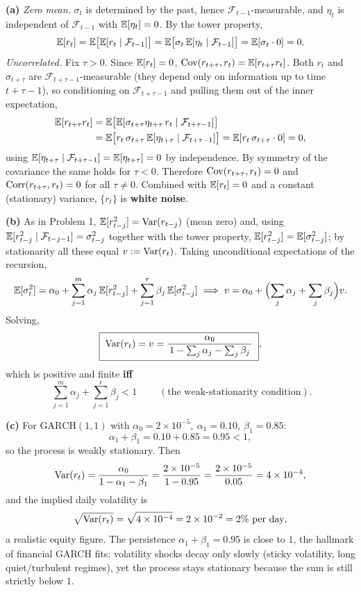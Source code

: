 \documentclass[11pt]{article}
\newcommand{\F}{\mathcal{F}}
\begin{document}
\textbf{(a)} \emph{Zero mean.} $\sigma_t$ is determined by the past, hence $\F_{t-1}$-measurable, and $\eta_t$ is independent of $\F_{t-1}$ with $\mathbb{E}[\eta_t]=0$. By the tower property,
\[
\E[r_t]=\E\bigl[\E[r_t\mid\F_{t-1}]\bigr]
=\E\bigl[\sigma_t\,\E[\eta_t\mid\F_{t-1}]\bigr]
=\E[\sigma_t\cdot0]=0 .
\]
\emph{Uncorrelated.} Fix $\tau>0$. Since $\mathbb{E}[r_t]=0$, $\operatorname{Cov}(r_{t+\tau},r_t)=\mathbb{E}[r_{t+\tau}r_t]$. Both $r_t$ and $\sigma_{t+\tau}$ are $\F_{t+\tau-1}$-measurable (they depend only on information up to time $t+\tau-1$), so conditioning on $\F_{t+\tau-1}$ and pulling them out of the inner expectation,
\[
\begin{aligned}
\E[r_{t+\tau}r_t]
&=\E\bigl[\E[\sigma_{t+\tau}\eta_{t+\tau}\,r_t\mid\F_{t+\tau-1}]\bigr]\\
&=\E\bigl[r_t\,\sigma_{t+\tau}\,\E[\eta_{t+\tau}\mid\F_{t+\tau-1}]\bigr]
=\E[r_t\,\sigma_{t+\tau}\cdot0]=0 ,
\end{aligned}
\]
using $\E[\eta_{t+\tau}\mid\F_{t+\tau-1}]=\E[\eta_{t+\tau}]=0$ by independence. By symmetry of the covariance the same holds for $\tau<0$. Therefore $\operatorname{Cov}(r_{t+\tau},r_t)=0$ and $\operatorname{Corr}(r_{t+\tau},r_t)=0$ for all $\tau\neq0$. Combined with $\mathbb{E}[r_t]=0$ and a constant (stationary) variance, $\{r_t\}$ is \textbf{white noise}.

\textbf{(b)} As in Problem 1, $\mathbb{E}[r_{t-j}^2]=\operatorname{Var}(r_{t-j})$ (mean zero) and, using $\E[r_{t-j}^2\mid\F_{t-j-1}]=\sigma_{t-j}^2$ together with the tower property, $\mathbb{E}[r_{t-j}^2]=\mathbb{E}[\sigma_{t-j}^2]$; by stationarity all these equal $v:=\operatorname{Var}(r_t)$. Taking unconditional expectations of the recursion,
\[
\mathbb{E}[\sigma_t^2]=\alpha_0+\sum_{j=1}^{m}\alpha_j\,\mathbb{E}[r_{t-j}^2]+\sum_{j=1}^{r}\beta_j\,\mathbb{E}[\sigma_{t-j}^2]
\;\Longrightarrow\;
v=\alpha_0+\Bigl(\sum_{j}\alpha_j+\sum_{j}\beta_j\Bigr)v .
\]
Solving,
\[
\boxed{\;\operatorname{Var}(r_t)=v=\frac{\alpha_0}{\,1-\sum_{j}\alpha_j-\sum_{j}\beta_j\,}\;},
\]
which is positive and finite \textbf{iff}
\[
\boxed{\;\sum_{j=1}^{m}\alpha_j+\sum_{j=1}^{r}\beta_j<1\;}\qquad(\text{the weak-stationarity condition}).
\]

\textbf{(c)} For $\mathrm{GARCH}(1,1)$ with $\alpha_0=2\times10^{-5},\ \alpha_1=0.10,\ \beta_1=0.85$:
\[
\alpha_1+\beta_1=0.10+0.85=0.95<1,
\]
so the process is weakly stationary. Then
\[
\operatorname{Var}(r_t)=\frac{\alpha_0}{1-\alpha_1-\beta_1}
=\frac{2\times10^{-5}}{1-0.95}
=\frac{2\times10^{-5}}{0.05}
=4\times10^{-4},
\]
and the implied daily volatility is
\[
\sqrt{\operatorname{Var}(r_t)}=\sqrt{4\times10^{-4}}=2\times10^{-2}=2\%\ \text{per day},
\]
a realistic equity figure. The persistence $\alpha_1+\beta_1=0.95$ is close to $1$, the hallmark of financial GARCH fits: volatility shocks decay only slowly (sticky volatility, long quiet/turbulent regimes), yet the process stays stationary because the sum is still strictly below $1$.
\end{document}
